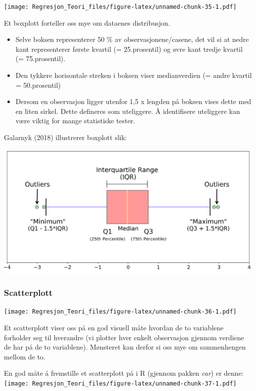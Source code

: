 \documentclass[
]{article}
\providecommand{\tightlist}{%
  \setlength{\itemsep}{0pt}\setlength{\parskip}{0pt}}
\begin{document}
\texttt{[image: Regresjon\_Teori\_files/figure-latex/unnamed-chunk-35-1.pdf]}

Et boxplott forteller oss mye om dataenes distribusjon.

\begin{itemize}
\tightlist
\item
  Selve boksen representerer 50 \% av observasjonene/casene, det vil si
  at nedre kant representerer første kvartil (= 25.prosentil) og øvre
  kant tredje kvartil (= 75.prosentil).
\item
  Den tykkere horisontale streken i boksen viser medianverdien (= andre
  kvartil = 50.prosentil)
\item
  Dersom en observasjon ligger utenfor 1,5 x lengden på boksen vises
  dette med en liten sirkel. Dette defineres som uteliggere. Å
  identifisere uteliggere kan være viktig for mange statistiske tester.
\end{itemize}

Galarnyk (2018) illustrerer boxplott slik:

\includegraphics{Boxplott.png}

\hypertarget{scatterplott}{%
\subsubsection{Scatterplott}\label{scatterplott}}

\texttt{[image: Regresjon\_Teori\_files/figure-latex/unnamed-chunk-36-1.pdf]}

Et scatterplott viser oss på en god visuell måte hvordan de to
variablene forholder seg til hverandre (vi plotter hver enkelt
observasjon gjennom verdiene de har på de to variablene). Mønsteret kan
derfor si oss mye om sammenhengen mellom de to.

En god måte å fremstille et scatterplott på i R (gjennom pakken
\emph{car}) er denne:
\texttt{[image: Regresjon\_Teori\_files/figure-latex/unnamed-chunk-37-1.pdf]}
\end{document}
